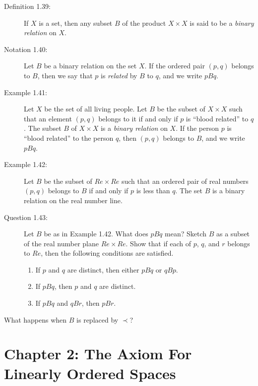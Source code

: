 \documentclass{book}
\begin{document}
\begin{description}

\item[Definition 1.39:] If $X$ is a set, then any subset $B$ of the product $X \times X$ is said to be a \emph{binary relation} on $X$.

\item[Notation 1.40:] Let $B$ be a binary relation on the set $X$. If the ordered pair $(p,q)$ belongs to $B$, then we say that $p$ is \emph{related} by $B$ to $q$, and we write $pBq$.

\item[Example 1.41:] Let $X$ be the set of all living people. Let $B$ be the subset of $X \times X$ such that an element $(p,q)$ belongs to it if and only if $p$ is ``blood related'' to $q$. The subset $B$ of $X \times X$ is a \emph{binary relation} on $X$. If the person $p$ is ``blood related'' to the person $q$, then $(p,q)$ belongs to $B$, and we write $pBq$.

\item[Example 1.42:] Let $B$ be the subset of $Re \times Re$ such that an ordered pair of real numbers $(p,q)$ belongs to $B$ if and only if $p$ is less than $q$. The set $B$ is a binary relation on the real number line.

\item[Question 1.43:] Let $B$ be as in Example 1.42. What does $pBq$ mean? Sketch $B$ as a subset of the real number plane $Re \times Re$. Show that if each of $p$, $q$, and $r$ belongs to $Re$, then the following conditions are satisfied.
\begin{enumerate}[\hspace{1cm}(a)]
  \item If $p$ and $q$ are distinct, then either $pBq$ or $qBp$.
  \item If $pBq$, then $p$ and $q$ are distinct.
  \item If $pBq$ and $qBr$, then $pBr$.
\end{enumerate}

\end{description}

What happens when $B$ is replaced by $\prec$?




\chapter*{Chapter 2: The Axiom For Linearly Ordered Spaces}
\end{document}
